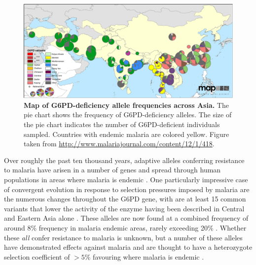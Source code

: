 \begin{figure}
\begin{center}
  \includegraphics[width=0.9 \textwidth]{Journal_figs/drift_selection/G6PD/G6pd_Howes_et_al_1475-2875-12-418-4.png} 
\caption{ 
{\bf Map of G6PD-deficiency allele frequencies across Asia.} 
The pie chart shows the frequency of G6PD-deficiency alleles. 
The size of the pie chart indicates the number of G6PD-deficient individuals sampled.
Countries with endemic malaria are colored yellow. 
Figure taken from \citet{Howes-g6pd-variants}
\url{http://www.malariajournal.com/content/12/1/418}. 
} \label{fig-G6PD-map}
\end{center}
\end{figure}

Over roughly the past ten thousand years, adaptive alleles conferring resistance to malaria have arisen in a number of genes 
and spread through human populations in areas where malaria is endemic
\citep{Kwiatkowski:05}. One particularly impressive case of convergent evolution in response to
selection pressures imposed by malaria are the numerous changes
throughout the G6PD gene,
with are at least 15 common variants that lower the activity of the
enzyme having been described in Central and Eastern Asia alone \citep{Howes-g6pd-variants}. 
These alleles are now found at a combined frequency of around 8\% frequency in malaria endemic areas,
rarely exceeding 20\% \citep{Howes-g6pd-preval}. Whether these {\it all} confer resistance to malaria is unknown,
but a number of these alleles have demonstrated effects against
malaria and are thought to have a heterozygote selection coefficient
of $>5\%$ favouring where malaria is endemic \citep{Ruwende-g6pd,tishkoff-g6pd,Louicharoen-g6pd}. 

